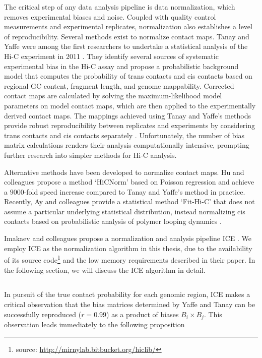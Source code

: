 The critical step of any data analysis pipeline is data \gls{normalization}, which removes experimental biases and noise.  Coupled with quality
control measurements and experimental replicates, normalization also establishes a level of reproducibility.
Several methods exist to normalize contact maps.  Tanay and Yaffe were among the first researchers to undertake a statistical analysis of the
Hi-C experiment in 2011 \citep{yaffe2011}.  They identify several sources of systematic experimental bias in the Hi-C assay and propose a
probabilistic background model that computes the probability of \glspl{trans contact} and \glspl{cis contact} based on regional
\gls{GC} content, fragment length, and genome mappability.  Corrected contact maps are calculated by solving the maximum-likelihood model
parameters on model contact maps, which are then applied to the experimentally derived contact maps.  The mappings
achieved using Tanay and Yaffe's methods provide robust reproducibility between replicates and experiments by considering
\glspl{trans contact} and \glspl{cis contact} separately \citep{yaffe2011}.  Unfortunately, the number of bias matrix calculations renders their
analysis computationally intensive, prompting further research into simpler methods for Hi-C analysis.

Alternative methods have been developed to normalize contact maps.  Hu and colleagues propose a method `HiCNorm' based on Poisson
regression and achieve a $9000$-fold speed increase compared to Tanay and Yaffe's method \citep{hu2012} in practice.  Recently, Ay and colleagues
provide a statistical method `Fit-Hi-C' that does not assume a particular underlying statistical distribution, instead normalizing \glspl{cis contact}
based on probabilistic analysis of polymer looping dynamics \citep{ay2014}.

Imakaev and colleagues propose a normalization and analysis pipeline \gls{ICE} \citep{imakaev2012}.  We employ \gls{ICE} as the normalization
algorithm in this thesis, due to the availability of its source code\footnote{source: \url{http://mirnylab.bitbucket.org/hiclib/}} and the low
memory requirements described in their paper.  In the following section, we will discuss the \gls{ICE} algorithm in detail.

\subsection*{}

In pursuit of the true contact probability for each genomic region, \gls{ICE} makes a critical observation that the bias matrices determined by
Yaffe and Tanay \citep{yaffe2011} can be successfully reproduced ($r = 0.99$) as a product of biases $B_i \times B_j$.  This observation leads
immediately to the following proposition

